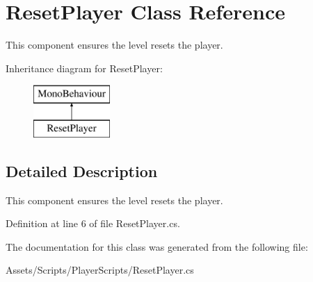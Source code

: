 \hypertarget{class_reset_player}{\section{Reset\+Player Class Reference}
\label{class_reset_player}
}


This component ensures the level resets the player.  


Inheritance diagram for Reset\+Player\+:\begin{figure}[H]
\begin{center}
\leavevmode
\includegraphics[height=2.000000cm]{class_reset_player}
\end{center}
\end{figure}


\subsection{Detailed Description}
This component ensures the level resets the player. 



Definition at line 6 of file Reset\+Player.\+cs.



The documentation for this class was generated from the following file\+:\begin{DoxyCompactItemize}
\item 
Assets/\+Scripts/\+Player\+Scripts/Reset\+Player.\+cs\end{DoxyCompactItemize}
